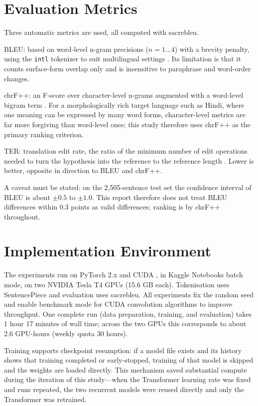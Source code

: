 \documentclass[a4paper,12pt]{vpcoe}
\begin{document}
\section{Evaluation Metrics}
Three automatic metrics are used, all computed with sacrebleu.

BLEU: based on word-level n-gram precisions ($n=1\ldots4$) with a brevity penalty, using the \texttt{intl} tokenizer to suit multilingual settings \cite{papineni2002}. Its limitation is that it counts surface-form overlap only and is insensitive to paraphrase and word-order changes.

chrF++: an F-score over character-level n-grams augmented with a word-level bigram term \cite{popovic2017}. For a morphologically rich target language such as Hindi, where one meaning can be expressed by many word forms, character-level metrics are far more forgiving than word-level ones; this study therefore uses chrF++ as the primary ranking criterion.

TER: translation edit rate, the ratio of the minimum number of edit operations needed to turn the hypothesis into the reference to the reference length \cite{snover2006}. Lower is better, opposite in direction to BLEU and chrF++.

A caveat must be stated: on the 2,505-sentence test set the confidence interval of BLEU is about $\pm0.5$ to $\pm1.0$. This report therefore does not treat BLEU differences within 0.3 points as valid differences; ranking is by chrF++ throughout.

\section{Implementation Environment}
The experiments run on PyTorch 2.x and CUDA \cite{paszke2019}, in Kaggle Notebooks batch mode, on two NVIDIA Tesla T4 GPUs (15.6 GB each). Tokenisation uses SentencePiece and evaluation uses sacrebleu. All experiments fix the random seed and enable benchmark mode for CUDA convolution algorithms to improve throughput. One complete run (data preparation, training, and evaluation) takes 1 hour 17 minutes of wall time; across the two GPUs this corresponds to about 2.6 GPU-hours (weekly quota 30 hours).

Training supports checkpoint resumption: if a model file exists and its history shows that training completed or early-stopped, training of that model is skipped and the weights are loaded directly. This mechanism saved substantial compute during the iteration of this study---when the Transformer learning rate was fixed and runs repeated, the two recurrent models were reused directly and only the Transformer was retrained.
\end{document}
